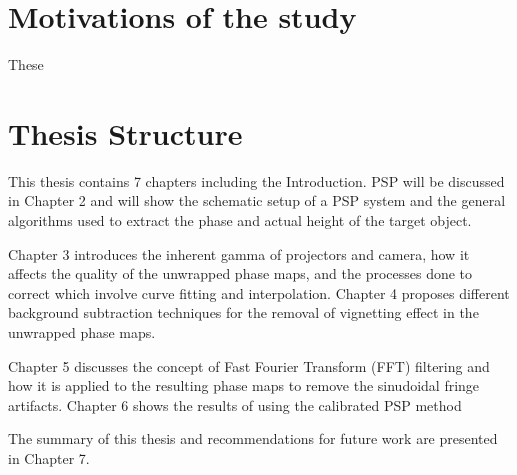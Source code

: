 \section{Motivations of the study}

These 

\section{Thesis Structure}

This thesis contains 7 chapters including the Introduction. PSP will be discussed in Chapter 2 and will show the schematic setup of a PSP system and the general algorithms used to extract the phase and actual height of the target object. 

Chapter 3 introduces the inherent gamma of projectors and camera, how it affects the quality of the unwrapped phase maps, and the processes done to correct which involve curve fitting and interpolation. 
Chapter 4 proposes different background subtraction techniques for the removal of vignetting effect in the unwrapped phase maps. 

Chapter 5 discusses the concept of Fast Fourier Transform (FFT) filtering and how it is applied to the resulting phase maps to remove the sinudoidal fringe artifacts.
Chapter 6 shows the results of using the calibrated PSP method 

The summary of this thesis and recommendations for future work are presented in Chapter 7.


